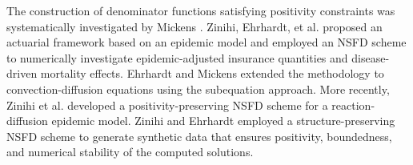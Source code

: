 \documentclass[final,12pt,3p]{elsarticle}
\theoremstyle{plain}
\theoremstyle{definition}
\theoremstyle{remark}
\begin{document}
The construction of denominator functions satisfying positivity constraints was systematically investigated by Mickens \cite{Mickens1999, Mickens2006}. 
Zinihi, Ehrhardt, et al. \cite{Zinihi2026Actuarial} proposed an actuarial framework based on an epidemic model and employed an NSFD scheme to numerically investigate epidemic-adjusted insurance quantities and disease-driven mortality effects.
Ehrhardt and Mickens \cite{Ehrhardt2013} extended the methodology to convection-diffusion equations using the subequation approach. 
More recently, Zinihi et al. \cite{Zinihi2025NSFD} developed a positivity-preserving NSFD scheme for a reaction-diffusion epidemic model.
Zinihi and Ehrhardt \cite{Zinihi2026CA} employed a structure-preserving NSFD scheme to generate synthetic data that ensures positivity, boundedness, and numerical stability of the computed solutions.
\end{document}
